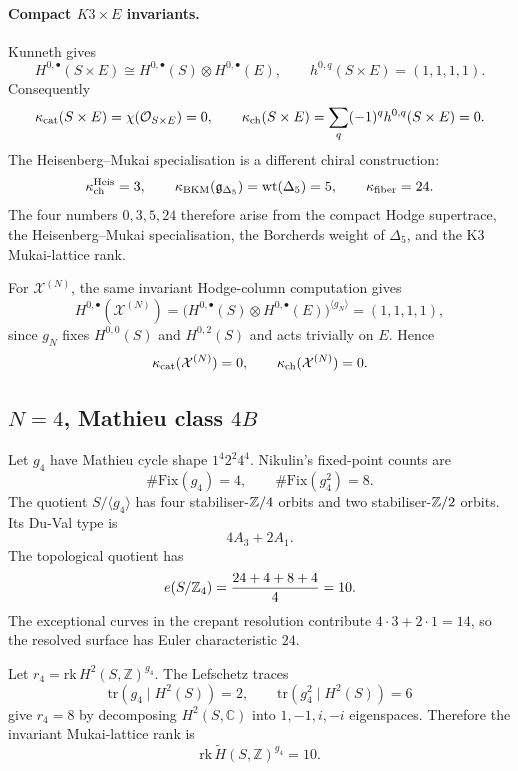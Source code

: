 \paragraph{Compact \texorpdfstring{$K3\times E$}{K3 x E} invariants.}
Kunneth gives
\[
  H^{0,\bullet}(S\times E)
  \cong H^{0,\bullet}(S)\otimes H^{0,\bullet}(E),
  \qquad h^{0,q}(S\times E)=(1,1,1,1).
\]
Consequently
\[
  \kappa_{\mathrm{cat}}(S\times E)=\chi(\mathcal{O}_{S\times E})=0,\qquad
  \kappa_{\mathrm{ch}}(S\times E)=\sum_q(-1)^q h^{0,q}(S\times E)=0 .
\]
The Heisenberg--Mukai specialisation is a different chiral construction:
\[
  \kappa_{\mathrm{ch}}^{\mathrm{Heis}}=3,\qquad
  \kappa_{\mathrm{BKM}}(\mathfrak{g}_{\Delta_5})=\mathrm{wt}(\Delta_5)=5,\qquad
  \kappa_{\mathrm{fiber}}=24 .
\]
The four numbers $0,3,5,24$ therefore arise from the compact Hodge
supertrace, the Heisenberg--Mukai specialisation, the Borcherds weight
of $\Delta_5$, and the K3 Mukai-lattice rank.

For $\mathcal{X}^{(N)}$, the same invariant Hodge-column computation
gives
\[
  H^{0,\bullet}(\mathcal{X}^{(N)})
  =
  \bigl(H^{0,\bullet}(S)\otimes H^{0,\bullet}(E)\bigr)^{\langle g_N\rangle}
  =
  (1,1,1,1),
\]
since $g_N$ fixes $H^{0,0}(S)$ and $H^{0,2}(S)$ and acts trivially on
$E$. Hence
\[
  \kappa_{\mathrm{cat}}(\mathcal{X}^{(N)})=0,\qquad
  \kappa_{\mathrm{ch}}(\mathcal{X}^{(N)})=0 .
\]

\subsection*{$N=4$, Mathieu class $4B$}

Let $g_4$ have Mathieu cycle shape $1^{4}2^{2}4^{4}$. Nikulin's
fixed-point counts are
\[
  \#\mathrm{Fix}(g_4)=4,\qquad
  \#\mathrm{Fix}(g_4^2)=8 .
\]
The quotient $S/\langle g_4\rangle$ has four stabiliser-$\mathbb{Z}/4$ orbits
and two stabiliser-$\mathbb{Z}/2$ orbits. Its Du-Val type is
\[
  4A_3+2A_1 .
\]
The topological quotient has
\[
  e(S/\mathbb{Z}_4)=\frac{24+4+8+4}{4}=10.
\]
The exceptional curves in the crepant resolution contribute
$4\cdot3+2\cdot1=14$, so the resolved surface has Euler characteristic
$24$.

Let $r_4=\mathrm{rk}\,H^2(S,\mathbb{Z})^{g_4}$. The Lefschetz traces
\[
  \mathrm{tr}(g_4\mid H^2(S))=2,\qquad
  \mathrm{tr}(g_4^2\mid H^2(S))=6
\]
give $r_4=8$ by decomposing $H^2(S,\mathbb{C})$ into
$1,-1,i,-i$ eigenspaces. Therefore the invariant Mukai-lattice rank is
\[
  \mathrm{rk}\,\widetilde H(S,\mathbb{Z})^{g_4}=10 .
\]

